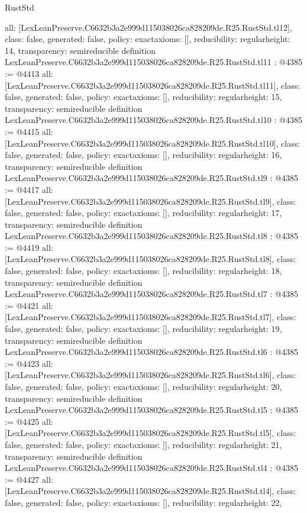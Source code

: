 \begin{lexlean}{RustStd}
\begin{coremodule}
{  all: [LexLeanPreserve.C6632b3a2e999d115038026ca828209de.R25.RustStd.tl12],
  class: false,
  generated: false,
  policy: exact{axioms: []},
  reducibility: regular{height: 14},
  transparency: semireducible
}
definition LexLeanPreserve.C6632b3a2e999d115038026ca828209de.R25.RustStd.tl11 : @4385 := @4413 {
  all: [LexLeanPreserve.C6632b3a2e999d115038026ca828209de.R25.RustStd.tl11],
  class: false,
  generated: false,
  policy: exact{axioms: []},
  reducibility: regular{height: 15},
  transparency: semireducible
}
definition LexLeanPreserve.C6632b3a2e999d115038026ca828209de.R25.RustStd.tl10 : @4385 := @4415 {
  all: [LexLeanPreserve.C6632b3a2e999d115038026ca828209de.R25.RustStd.tl10],
  class: false,
  generated: false,
  policy: exact{axioms: []},
  reducibility: regular{height: 16},
  transparency: semireducible
}
definition LexLeanPreserve.C6632b3a2e999d115038026ca828209de.R25.RustStd.tl9 : @4385 := @4417 {
  all: [LexLeanPreserve.C6632b3a2e999d115038026ca828209de.R25.RustStd.tl9],
  class: false,
  generated: false,
  policy: exact{axioms: []},
  reducibility: regular{height: 17},
  transparency: semireducible
}
definition LexLeanPreserve.C6632b3a2e999d115038026ca828209de.R25.RustStd.tl8 : @4385 := @4419 {
  all: [LexLeanPreserve.C6632b3a2e999d115038026ca828209de.R25.RustStd.tl8],
  class: false,
  generated: false,
  policy: exact{axioms: []},
  reducibility: regular{height: 18},
  transparency: semireducible
}
definition LexLeanPreserve.C6632b3a2e999d115038026ca828209de.R25.RustStd.tl7 : @4385 := @4421 {
  all: [LexLeanPreserve.C6632b3a2e999d115038026ca828209de.R25.RustStd.tl7],
  class: false,
  generated: false,
  policy: exact{axioms: []},
  reducibility: regular{height: 19},
  transparency: semireducible
}
definition LexLeanPreserve.C6632b3a2e999d115038026ca828209de.R25.RustStd.tl6 : @4385 := @4423 {
  all: [LexLeanPreserve.C6632b3a2e999d115038026ca828209de.R25.RustStd.tl6],
  class: false,
  generated: false,
  policy: exact{axioms: []},
  reducibility: regular{height: 20},
  transparency: semireducible
}
definition LexLeanPreserve.C6632b3a2e999d115038026ca828209de.R25.RustStd.tl5 : @4385 := @4425 {
  all: [LexLeanPreserve.C6632b3a2e999d115038026ca828209de.R25.RustStd.tl5],
  class: false,
  generated: false,
  policy: exact{axioms: []},
  reducibility: regular{height: 21},
  transparency: semireducible
}
definition LexLeanPreserve.C6632b3a2e999d115038026ca828209de.R25.RustStd.tl4 : @4385 := @4427 {
  all: [LexLeanPreserve.C6632b3a2e999d115038026ca828209de.R25.RustStd.tl4],
  class: false,
  generated: false,
  policy: exact{axioms: []},
  reducibility: regular{height: 22},
}
\end{coremodule}
\end{lexlean}
